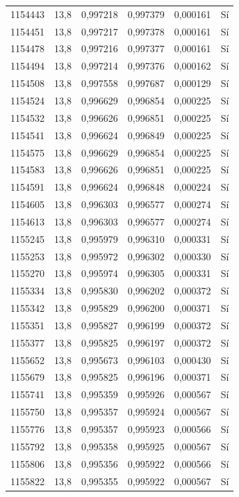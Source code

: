 \begin{longtable}{lccccc}
1154443 & 13,8 & 0,997218 & 0,997379 & 0,000161 & Sí \\
1154451 & 13,8 & 0,997217 & 0,997378 & 0,000161 & Sí \\
1154478 & 13,8 & 0,997216 & 0,997377 & 0,000161 & Sí \\
1154494 & 13,8 & 0,997214 & 0,997376 & 0,000162 & Sí \\
1154508 & 13,8 & 0,997558 & 0,997687 & 0,000129 & Sí \\
1154524 & 13,8 & 0,996629 & 0,996854 & 0,000225 & Sí \\
1154532 & 13,8 & 0,996626 & 0,996851 & 0,000225 & Sí \\
1154541 & 13,8 & 0,996624 & 0,996849 & 0,000225 & Sí \\
1154575 & 13,8 & 0,996629 & 0,996854 & 0,000225 & Sí \\
1154583 & 13,8 & 0,996626 & 0,996851 & 0,000225 & Sí \\
1154591 & 13,8 & 0,996624 & 0,996848 & 0,000224 & Sí \\
1154605 & 13,8 & 0,996303 & 0,996577 & 0,000274 & Sí \\
1154613 & 13,8 & 0,996303 & 0,996577 & 0,000274 & Sí \\
1155245 & 13,8 & 0,995979 & 0,996310 & 0,000331 & Sí \\
1155253 & 13,8 & 0,995972 & 0,996302 & 0,000330 & Sí \\
1155270 & 13,8 & 0,995974 & 0,996305 & 0,000331 & Sí \\
1155334 & 13,8 & 0,995830 & 0,996202 & 0,000372 & Sí \\
1155342 & 13,8 & 0,995829 & 0,996200 & 0,000371 & Sí \\
1155351 & 13,8 & 0,995827 & 0,996199 & 0,000372 & Sí \\
1155377 & 13,8 & 0,995825 & 0,996197 & 0,000372 & Sí \\
1155652 & 13,8 & 0,995673 & 0,996103 & 0,000430 & Sí \\
1155679 & 13,8 & 0,995825 & 0,996196 & 0,000371 & Sí \\
1155741 & 13,8 & 0,995359 & 0,995926 & 0,000567 & Sí \\
1155750 & 13,8 & 0,995357 & 0,995924 & 0,000567 & Sí \\
1155776 & 13,8 & 0,995357 & 0,995923 & 0,000566 & Sí \\
1155792 & 13,8 & 0,995358 & 0,995925 & 0,000567 & Sí \\
1155806 & 13,8 & 0,995356 & 0,995922 & 0,000566 & Sí \\
1155822 & 13,8 & 0,995355 & 0,995922 & 0,000567 & Sí \\

\end{longtable}
